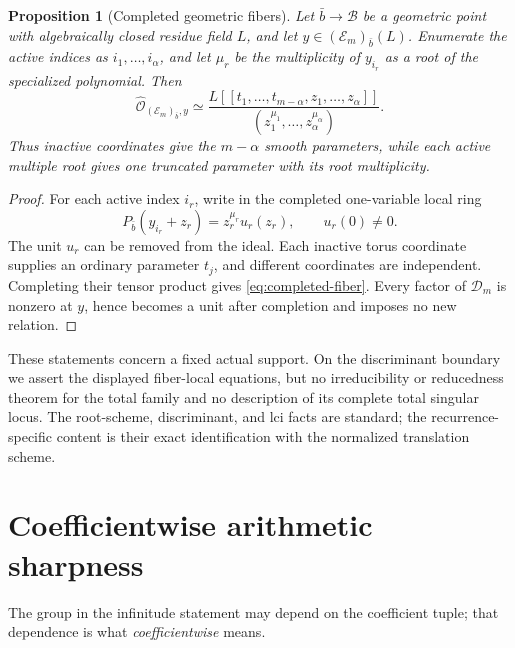 \documentclass[11pt]{article}
\newtheorem{proposition}[lemma]{Proposition}
\theoremstyle{remark}
\numberwithin{equation}{section}
\begin{document}
\begin{proposition}[Completed geometric fibers]\label{prop:completed-fiber}
Let \(\bar b\to\mathcal B\) be a geometric point with algebraically closed residue field \(L\), and let \(y\in(\mathcal E_m)_{\bar b}(L)\).  Enumerate the active indices as \(i_1,\ldots,i_\alpha\), and let \(\mu_r\) be the multiplicity of \(y_{i_r}\) as a root of the specialized polynomial.  Then
\begin{equation}\label{eq:completed-fiber}
 \widehat{\mathcal O}_{(\mathcal E_m)_{\bar b},y}
 \simeq
 \frac{L[[t_1,\ldots,t_{m-\alpha},z_1,\ldots,z_\alpha]]}
      {(z_1^{\mu_1},\ldots,z_\alpha^{\mu_\alpha})}.
\end{equation}
Thus inactive coordinates give the \(m-\alpha\) smooth parameters, while each active multiple root gives one truncated parameter with its root multiplicity.
\end{proposition}

\begin{proof}
For each active index \(i_r\), write in the completed one-variable local ring
\[
 P_{\bar b}(y_{i_r}+z_r)=z_r^{\mu_r}u_r(z_r),\qquad u_r(0)\neq0.
\]
The unit \(u_r\) can be removed from the ideal.  Each inactive torus coordinate supplies an ordinary parameter \(t_j\), and different coordinates are independent.  Completing their tensor product gives \eqref{eq:completed-fiber}.  Every factor of \(\mathcal D_m\) is nonzero at \(y\), hence becomes a unit after completion and imposes no new relation.
\end{proof}

These statements concern a fixed actual support.  On the discriminant boundary we assert the displayed fiber-local equations, but no irreducibility or reducedness theorem for the total family and no description of its complete total singular locus.  The root-scheme, discriminant, and lci facts are standard; the recurrence-specific content is their exact identification with the normalized translation scheme.

\section{Coefficientwise arithmetic sharpness}\label{sec:partA-arithmetic}

The group in the infinitude statement may depend on the coefficient tuple; that dependence is what \emph{coefficientwise} means.
\end{document}
